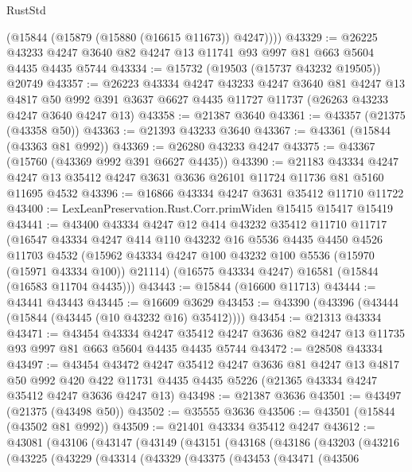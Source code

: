 \begin{lexlean}{RustStd}
\begin{coremodule}
        (@15844 (@15879 (@15880 (@16615 @11673)) @4247))))
@43329 := @26225 @43233 @4247 @3640 @82 @4247 @13 @11741 @93 @997 @81 @663 @5604 @4435 @4435 @5744
@43334 := @15732 (@19503 (@15737 @43232 @19505)) @20749
@43357 := @26223
    @43334
    @4247
    @43233
    @4247
    @3640
    @81
    @4247
    @13
    @4817
    @50
    @992
    @391
    @3637
    @6627
    @4435
    @11727
    @11737
    (@26263 @43233 @4247 @3640 @4247 @13)
@43358 := @21387 @3640
@43361 := @43357 (@21375 (@43358 @50))
@43363 := @21393 @43233 @3640
@43367 := @43361 (@15844 (@43363 @81 @992))
@43369 := @26280 @43233 @4247
@43375 := @43367 (@15760 (@43369 @992 @391 @6627 @4435))
@43390 := @21183
    @43334
    @4247
    @4247
    @13
    @35412
    @4247
    @3631
    @3636
    @26101
    @11724
    @11736
    @81
    @5160
    @11695
    @4532
@43396 := @16866 @43334 @4247 @3631 @35412 @11710 @11722
@43400 := LexLeanPreservation.Rust.Corr.primWiden @15415 @15417 @15419
@43441 := @43400
    @43334
    @4247
    @12
    @414
    @43232
    @35412
    @11710
    @11717
    (@16547
      @43334
      @4247
      @414
      @110
      @43232
      @16
      @5536
      @4435
      @4450
      @4526
      @11703
      @4532
      (@15962 @43334 @4247 @100 @43232 @100 @5536 (@15970 (@15971 @43334 @100)) @21114)
      (@16575 @43334 @4247)
      @16581
      (@15844 (@16583 @11704 @4435)))
@43443 := @15844 (@16600 @11713)
@43444 := @43441 @43443
@43445 := @16609 @3629
@43453 := @43390 (@43396 (@43444 (@15844 (@43445 (@10 @43232 @16) @35412))))
@43454 := @21313 @43334
@43471 := @43454
    @43334
    @4247
    @35412
    @4247
    @3636
    @82
    @4247
    @13
    @11735
    @93
    @997
    @81
    @663
    @5604
    @4435
    @4435
    @5744
@43472 := @28508 @43334
@43497 := @43454
    @43472
    @4247
    @35412
    @4247
    @3636
    @81
    @4247
    @13
    @4817
    @50
    @992
    @420
    @422
    @11731
    @4435
    @4435
    @5226
    (@21365 @43334 @4247 @35412 @4247 @3636 @4247 @13)
@43498 := @21387 @3636
@43501 := @43497 (@21375 (@43498 @50))
@43502 := @35555 @3636
@43506 := @43501 (@15844 (@43502 @81 @992))
@43509 := @21401 @43334 @35412 @4247
@43612 := @43081
    (@43106
      (@43147
        (@43149
          (@43151
            (@43168
              (@43186
                (@43203
                  (@43216
                    (@43225
                      (@43229
                        (@43314
                          (@43329
                            (@43375
                              (@43453
                                (@43471
                                  (@43506

\end{coremodule}
\end{lexlean}
